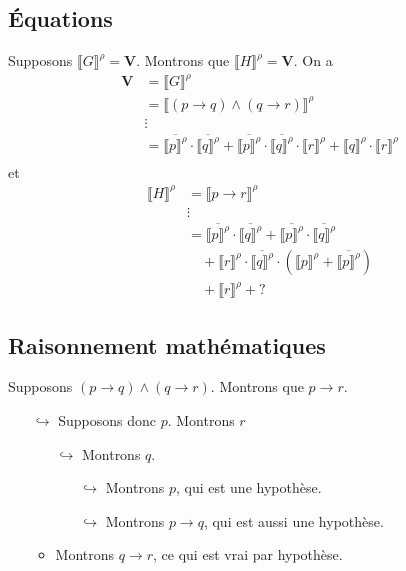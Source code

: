 \subsection{Équations}
Supposons $\llbracket G \rrbracket^\rho = \mathbf{V}$. Montrons que $\llbracket H \rrbracket^\rho = \mathbf{V}$.
On a
\begin{align*}
	\mathbf{V} &= \llbracket G \rrbracket^\rho\\
	&= \llbracket (p\to q) \land(q \to r) \rrbracket^\rho \\
	&\vdots \\
	&= \overline{\llbracket p \rrbracket^\rho} \cdot \overline{\llbracket q \rrbracket^\rho} + \overline{\llbracket p \rrbracket^\rho} \cdot \overline{\llbracket q \rrbracket^\rho} \cdot \llbracket r \rrbracket^\rho + \llbracket q \rrbracket^\rho \cdot \llbracket r \rrbracket^\rho \\
\end{align*}
et
\begin{align*}
	\llbracket H \rrbracket^\rho &= \llbracket p\to r \rrbracket^\rho \\
	&\vdots \\
	&= \overline{\llbracket p \rrbracket^\rho} \cdot \overline{\llbracket q \rrbracket^\rho}
	+ \overline{\llbracket p \rrbracket^\rho} \cdot \overline{\llbracket q \rrbracket^\rho}\\
	&\quad+ \llbracket r \rrbracket^\rho \cdot \overline{\llbracket q \rrbracket^\rho} \cdot \left( \llbracket p \rrbracket^\rho + \overline{\llbracket p \rrbracket^\rho} \right) \\
	&\quad + \llbracket r \rrbracket^\rho + ?
\end{align*}

\subsection{Raisonnement mathématiques}

Supposons $(p \to q) \land (q \to r)$. Montrons que $p \to r$.\\
\begin{itemize}
	\item[$\hookrightarrow$] Supposons donc $p$. Montrons $r$\/
		\begin{itemize}
			\item[$\hookrightarrow$] Montrons $q$.
				\begin{itemize}
					\item[$\hookrightarrow$] Montrons $p$, qui est une hypothèse.
					\item[$\hookrightarrow$] Montrons $p\to q$, qui est aussi une hypothèse.
				\end{itemize}
			\item Montrons $q \to r$, ce qui est vrai par hypothèse.
		\end{itemize}
\end{itemize}

